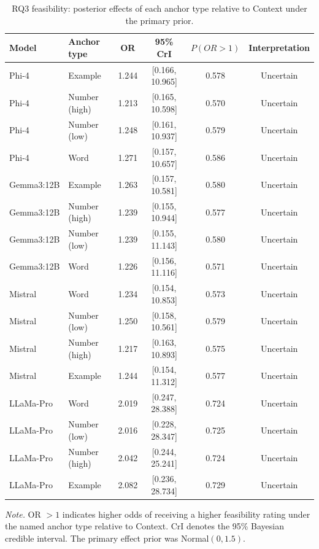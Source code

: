\begin{table}[tbp]
\caption{RQ3 feasibility: posterior effects of each anchor type relative to Context under the primary prior.}
\label{tab:rq3_feasibility_bayesian}
\begin{tabular}{llcccc}
\toprule
Model & Anchor type & OR & 95\% CrI & $P(OR>1)$ & Interpretation \\
\midrule
Phi-4 & Example & 1.244 & [0.166, 10.965] & 0.578 & Uncertain \\
Phi-4 & Number (high) & 1.213 & [0.165, 10.598] & 0.570 & Uncertain \\
Phi-4 & Number (low) & 1.248 & [0.161, 10.937] & 0.579 & Uncertain \\
Phi-4 & Word & 1.271 & [0.157, 10.657] & 0.586 & Uncertain \\
Gemma3:12B & Example & 1.263 & [0.157, 10.581] & 0.580 & Uncertain \\
Gemma3:12B & Number (high) & 1.239 & [0.155, 10.944] & 0.577 & Uncertain \\
Gemma3:12B & Number (low) & 1.239 & [0.155, 11.143] & 0.580 & Uncertain \\
Gemma3:12B & Word & 1.226 & [0.156, 11.116] & 0.571 & Uncertain \\
Mistral & Word & 1.234 & [0.154, 10.853] & 0.573 & Uncertain \\
Mistral & Number (low) & 1.250 & [0.158, 10.561] & 0.579 & Uncertain \\
Mistral & Number (high) & 1.217 & [0.163, 10.893] & 0.575 & Uncertain \\
Mistral & Example & 1.244 & [0.154, 11.312] & 0.577 & Uncertain \\
LLaMa-Pro & Word & 2.019 & [0.247, 28.388] & 0.724 & Uncertain \\
LLaMa-Pro & Number (low) & 2.016 & [0.228, 28.347] & 0.725 & Uncertain \\
LLaMa-Pro & Number (high) & 2.042 & [0.244, 25.241] & 0.724 & Uncertain \\
LLaMa-Pro & Example & 2.082 & [0.236, 28.734] & 0.729 & Uncertain \\
\bottomrule
\end{tabular}
\vspace{2pt}
\begin{minipage}{\linewidth}
\footnotesize\textit{Note.} OR $>1$ indicates higher odds of receiving a higher feasibility rating under the named anchor type relative to Context. CrI denotes the 95\% Bayesian credible interval. The primary effect prior was Normal$(0,1.5)$.
\end{minipage}
\end{table}
